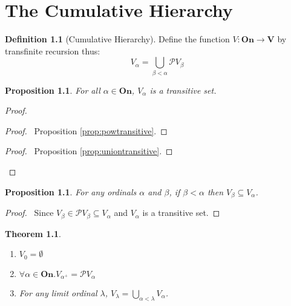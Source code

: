 \documentclass{book}
\let\qed\relax
\newtheorem{prop}[ax]{Proposition}
\newtheorem{thm}[ax]{Theorem}
\theoremstyle{definition}
\newtheorem{df}[ax]{Definition}
\begin{document}
\chapter{The Cumulative Hierarchy}

\begin{df}[Cumulative Hierarchy]
Define the function $V : \mathbf{On} \rightarrow \mathbf{V}$ by transfinite recursion thus:
\[ V_\alpha = \bigcup_{\beta < \alpha} \mathcal{P} V_\beta \]
\end{df}

\begin{prop}
For all $\alpha \in \mathbf{On}$, $V_\alpha$ is a transitive set.
\end{prop}

\begin{proof}
\pf
{}
\begin{proof}
	\pf\ Proposition \ref{prop:powtransitive}.
\end{proof}
\begin{proof}
	\pf\ Proposition \ref{prop:uniontransitive}.
\end{proof}
\qed
\end{proof}

\begin{prop}
\label{prop:Vmono}
For any ordinals $\alpha$ and $\beta$, if $\beta < \alpha$ then $V_\beta \subseteq V_\alpha$.
\end{prop}

\begin{proof}
\pf\ Since $V_\beta \in \mathcal{P} V_\beta \subseteq V_\alpha$ and $V_\alpha$ is a transitive set. \qed
\end{proof}

\begin{thm}$ $
\begin{enumerate}
\item $V_0 = \emptyset$
\item $\forall \alpha \in \mathbf{On}. V_{\alpha^+} = \mathcal{P} V_\alpha$
\item For any limit ordinal $\lambda$, $V_\lambda = \bigcup_{\alpha < \lambda} V_\alpha$.
\end{enumerate}
\end{thm}
\end{document}
